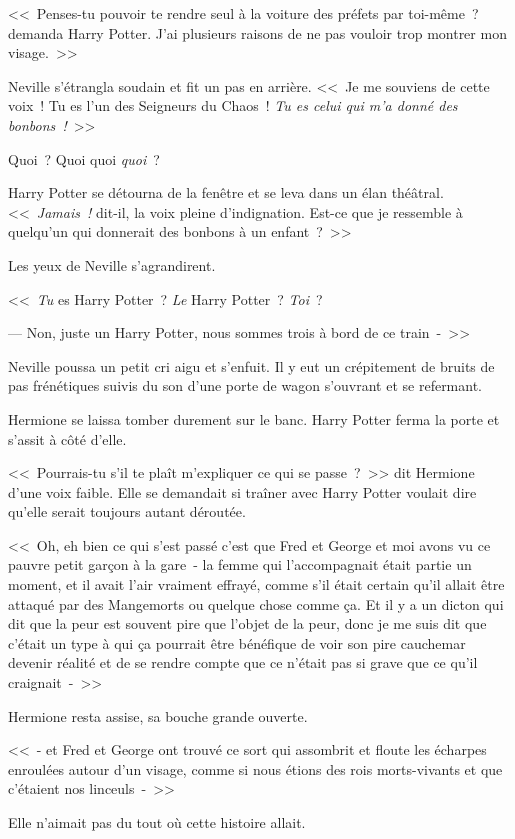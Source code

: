 <<~Penses-tu pouvoir te rendre seul à la voiture des préfets par toi-même~? demanda Harry Potter. J'ai plusieurs raisons de ne pas vouloir trop montrer mon visage.~>>

Neville s'étrangla soudain et fit un pas en arrière. <<~Je me souviens de cette voix~! Tu es l'un des Seigneurs du Chaos~! \emph{Tu es celui qui m'a donné des bonbons~!}~>>

Quoi~? Quoi quoi \emph{quoi}~?

Harry Potter se détourna de la fenêtre et se leva dans un élan théâtral. <<~\emph{Jamais~!} dit-il, la voix pleine d'indignation. Est-ce que je ressemble à quelqu'un qui donnerait des bonbons à un enfant~?~>>

Les yeux de Neville s'agrandirent.

<<~\emph{Tu} es Harry Potter~? \emph{Le} Harry Potter~? \emph{Toi}~?

--- Non, juste un Harry Potter, nous sommes trois à bord de ce train~-~>>

Neville poussa un petit cri aigu et s'enfuit. Il y eut un crépitement de bruits de pas frénétiques suivis du son d'une porte de wagon s'ouvrant et se refermant.

Hermione se laissa tomber durement sur le banc. Harry Potter ferma la porte et s'assit à côté d'elle.

<<~Pourrais-tu s'il te plaît m'expliquer ce qui se passe~?~>> dit Hermione d'une voix faible. Elle se demandait si traîner avec Harry Potter voulait dire qu'elle serait toujours autant déroutée.

<<~Oh, eh bien ce qui s'est passé c'est que Fred et George et moi avons vu ce pauvre petit garçon à la gare~- la femme qui l'accompagnait était partie un moment, et il avait l'air vraiment effrayé, comme s'il était certain qu'il allait être attaqué par des Mangemorts ou quelque chose comme ça. Et il y a un dicton qui dit que la peur est souvent pire que l'objet de la peur, donc je me suis dit que c'était un type à qui ça pourrait être bénéfique de voir son pire cauchemar devenir réalité et de se rendre compte que ce n'était pas si grave que ce qu'il craignait~-~>>

Hermione resta assise, sa bouche grande ouverte.

<<~- et Fred et George ont trouvé ce sort qui assombrit et floute les écharpes enroulées autour d'un visage, comme si nous étions des rois morts-vivants et que c'étaient nos linceuls~-~>>

Elle n'aimait pas du tout où cette histoire allait.

